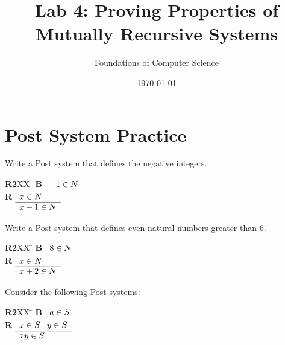 \documentclass[]{exam}
\title{Lab 4: Proving Properties of Mutually Recursive Systems}
\author{Foundations of Computer Science}
\date{\today}
\begin{document}
\maketitle

\setlength{\columnseprule}{1pt}
\section*{Post System Practice}
\begin{questions}
\question Write a Post system that defines the negative integers.
\begin{solution}
\begin{tabbing}
{\bf R2}XX \=  \kill
{\bf B} \>
        \(\begin{array}[t]{l}
        -1 \in N
        \end{array}\) \\[2ex]
{\bf R} \>
        \(\begin{array}[t]{l}
        x \in N \\
        \hline
        x-1 \in N
        \end{array}\)
\end{tabbing}
\end{solution}
\question Write a Post system that defines even natural numbers greater than $6$.
\begin{solution}
\begin{tabbing}
{\bf R2}XX \=  \kill
{\bf B} \>
        \(\begin{array}[t]{l}
        8 \in N
        \end{array}\) \\[2ex]
{\bf R} \>
        \(\begin{array}[t]{l}
        x \in N \\
        \hline
        x+2 \in N
        \end{array}\)
\end{tabbing}
\end{solution}
\question Consider the following Post systems:
\begin{multicols}{2}
\begin{tabbing}
{\bf R2}XX \=  \kill
{\bf B} \>
        \(\begin{array}[t]{l}
        a \in S
        \end{array}\) \\[2ex]
{\bf R} \>
        \(\begin{array}[t]{l}
        x \in S \;\;\;y \in S \\
        \hline
        xy \in S
        \end{array}\)
\end{tabbing}


\end{multicols}
\end{questions}
\end{document}
